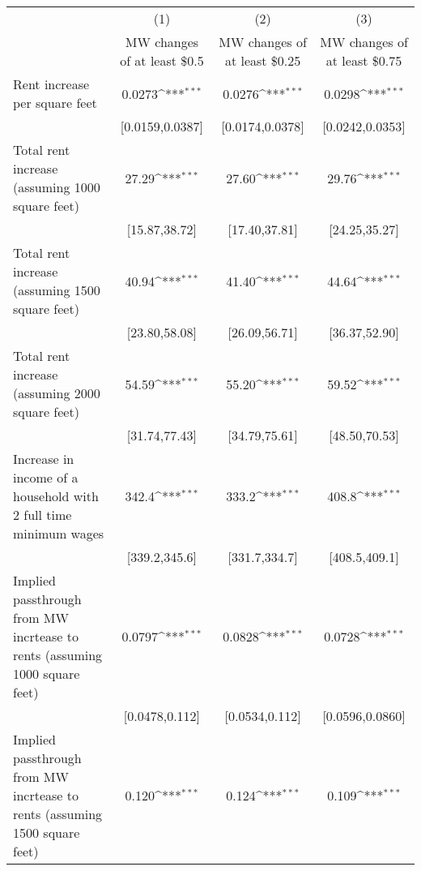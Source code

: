 {
\def\sym#1{\ifmmode^{#1}\else\(^{#1}\)\fi}
\begin{tabular}{l*{3}{c}}
\hline\hline
            &\multicolumn{1}{c}{(1)}        &\multicolumn{1}{c}{(2)}        &\multicolumn{1}{c}{(3)}        \\
            &\multicolumn{1}{c}{MW changes of at least \$0.5}&\multicolumn{1}{c}{MW changes of at least \$0.25}&\multicolumn{1}{c}{MW changes of at least \$0.75}\\
\hline
Rent increase per square feet&                0.0273\sym{***}&                0.0276\sym{***}&                0.0298\sym{***}\\
            &       [0.0159,0.0387]         &       [0.0174,0.0378]         &       [0.0242,0.0353]         \\
[1em]
Total rent increase (assuming 1000 square feet)&                 27.29\sym{***}&                 27.60\sym{***}&                 29.76\sym{***}\\
            &         [15.87,38.72]         &         [17.40,37.81]         &         [24.25,35.27]         \\
[1em]
Total rent increase (assuming 1500 square feet)&                 40.94\sym{***}&                 41.40\sym{***}&                 44.64\sym{***}\\
            &         [23.80,58.08]         &         [26.09,56.71]         &         [36.37,52.90]         \\
[1em]
Total rent increase (assuming 2000 square feet)&                 54.59\sym{***}&                 55.20\sym{***}&                 59.52\sym{***}\\
            &         [31.74,77.43]         &         [34.79,75.61]         &         [48.50,70.53]         \\
[1em]
Increase in income of a household with 2 full time minimum wages&                 342.4\sym{***}&                 333.2\sym{***}&                 408.8\sym{***}\\
            &         [339.2,345.6]         &         [331.7,334.7]         &         [408.5,409.1]         \\
[1em]
Implied passthrough from MW incrtease to rents (assuming 1000 square feet)&                0.0797\sym{***}&                0.0828\sym{***}&                0.0728\sym{***}\\
            &        [0.0478,0.112]         &        [0.0534,0.112]         &       [0.0596,0.0860]         \\
[1em]
Implied passthrough from MW incrtease to rents (assuming 1500 square feet)&                 0.120\sym{***}&                 0.124\sym{***}&                 0.109\sym{***}\\

\end{tabular}}
